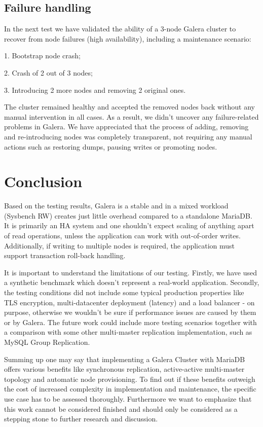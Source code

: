 \documentclass{sig-alternate}
\begin{document}
\subsection{Failure handling}

In the next test we have validated the ability of a 3-node Galera cluster to recover from node failures (high availability), including a maintenance scenario:

1. Bootstrap node crash;

2. Crash of 2 out of 3 nodes;

3. Introducing 2 more nodes and removing 2 original ones.

The cluster remained healthy and accepted the removed nodes back without any manual intervention in all cases. As a result, we didn't uncover any failure-related problems in Galera. We have appreciated that the process of adding, removing and re-introducing nodes was completely transparent, not requiring any manual actions such as restoring dumps, pausing writes or promoting nodes.

\section{Conclusion}
Based on the testing results, Galera is a stable and in a mixed workload (Sysbench RW) creates just little overhead compared to a standalone MariaDB. It is primarily an HA system and one shouldn't expect scaling of anything apart of read operations, unless the application can work with out-of-order writes. Additionally, if writing to multiple nodes is required, the application must support transaction roll-back handling.

It is important to understand the limitations of our testing. Firstly, we have used a synthetic benchmark which doesn't represent a real-world application. Secondly, the testing conditions did not include some typical production properties like TLS encryption, multi-datacenter deployment (latency) and a load balancer - on purpose, otherwise we wouldn't be sure if performance issues are caused by them or by Galera. The future work could include more testing scenarios together with a comparison with some other multi-master replication implementation, such as MySQL Group Replication.

Summing up one may say that implementing a Galera Cluster with MariaDB offers various benefits like synchronous replication, active-active multi-master topology and automatic node provisioning. To find out if these benefits outweigh the cost of increased complexity in implementation and maintenance, the specific use case has to be assessed thoroughly. Furthermore we want to emphasize that this work cannot be considered finished and should only be considered as a stepping stone to further research and discussion.
\end{document}
